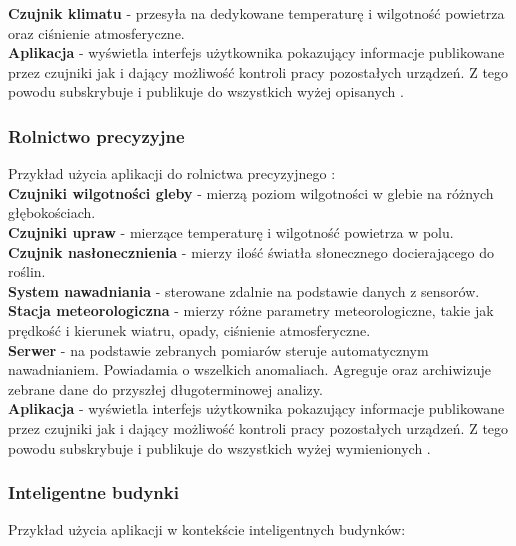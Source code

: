\textbf{Czujnik klimatu} - przesyła na dedykowane  temperaturę i wilgotność powietrza oraz ciśnienie atmosferyczne.\\

\textbf{Aplikacja} - wyświetla interfejs użytkownika pokazujący informacje publikowane przez czujniki jak i dający możliwość kontroli pracy pozostałych urządzeń. Z tego powodu subskrybuje i publikuje do wszystkich wyżej opisanych .\\

\newpage

\subsubsection{Rolnictwo precyzyjne}
Przykład użycia aplikacji do rolnictwa precyzyjnego \cite{rolnictwoprecyzyjne}:\\

\textbf{Czujniki wilgotności gleby} - mierzą poziom wilgotności w glebie na różnych głębokościach.\\

\textbf{Czujniki upraw} - mierzące temperaturę i wilgotność powietrza w polu.\\

\textbf{Czujnik nasłonecznienia} - mierzy ilość światła słonecznego docierającego do roślin.\\

\textbf{System nawadniania} - sterowane zdalnie na podstawie danych z sensorów.\\

\textbf{Stacja meteorologiczna} - mierzy różne parametry meteorologiczne, takie jak prędkość i kierunek wiatru, opady, ciśnienie atmosferyczne.\\

\textbf{Serwer} - na podstawie zebranych pomiarów steruje automatycznym nawadnianiem. Powiadamia o wszelkich anomaliach. Agreguje oraz archiwizuje zebrane dane do przyszłej długoterminowej analizy.\\

\textbf{Aplikacja} - wyświetla interfejs użytkownika pokazujący informacje publikowane przez czujniki jak i dający możliwość kontroli pracy pozostałych urządzeń. Z tego powodu subskrybuje i publikuje do wszystkich wyżej wymienionych .\\

\newpage

\subsubsection{Inteligentne budynki}
Przykład użycia aplikacji w kontekście inteligentnych budynków:\\

